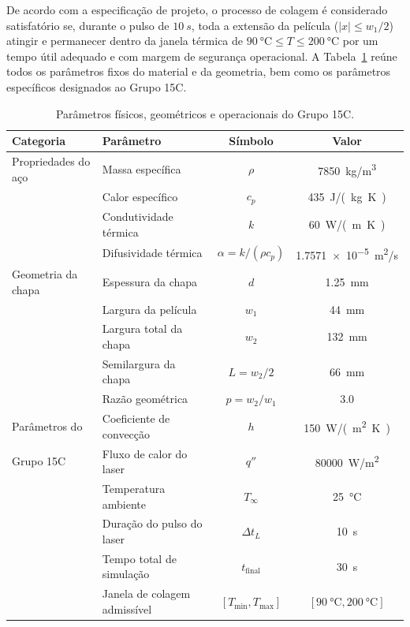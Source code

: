 \documentclass[11pt,a4paper]{article}
\begin{document}
De acordo com a especificação de projeto, o processo de colagem é considerado satisfatório se, durante o pulso de $\SI{10}{s}$, toda a extensão da película ($|x| \le w_1/2$) atingir e permanecer dentro da janela térmica de $\SI{90}{\celsius} \le T \le \SI{200}{\celsius}$ por um tempo útil adequado e com margem de segurança operacional. A Tabela~\ref{tab:parametros} reúne todos os parâmetros fixos do material e da geometria, bem como os parâmetros específicos designados ao Grupo 15C.

\begin{table}[H]
    \centering
    \caption{Parâmetros físicos, geométricos e operacionais do Grupo 15C.}
    \label{tab:parametros}
    \begin{tabular}{llcc}
        \toprule
        \textbf{Categoria} & \textbf{Parâmetro} & \textbf{Símbolo} & \textbf{Valor} \\
        \midrule
        Propriedades do aço & Massa específica & $\rho$ & \SI{7850}{kg/m^3} \\
                            & Calor específico & $c_p$ & \SI{435}{J/(kg.K)} \\
                            & Condutividade térmica & $k$ & \SI{60}{W/(m.K)} \\
                            & Difusividade térmica & $\alpha = k/(\rho c_p)$ & \SI{1,7571e-5}{m^2/s} \\
        \midrule
        Geometria da chapa  & Espessura da chapa & $d$ & \SI{1,25}{mm} \\
                            & Largura da película & $w_1$ & \SI{44}{mm} \\
                            & Largura total da chapa & $w_2$ & \SI{132}{mm} \\
                            & Semilargura da chapa & $L = w_2/2$ & \SI{66}{mm} \\
                            & Razão geométrica & $p = w_2/w_1$ & \num{3,0} \\
        \midrule
        Parâmetros do       & Coeficiente de convecção & $h$ & \SI{150}{W/(m^2.K)} \\
        Grupo 15C           & Fluxo de calor do laser & $q''$ & \SI{80000}{W/m^2} \\
                            & Temperatura ambiente & $T_\infty$ & \SI{25}{\celsius} \\
                            & Duração do pulso do laser & $\Delta t_L$ & \SI{10}{s} \\
                            & Tempo total de simulação & $t_{\text{final}}$ & \SI{30}{s} \\
                            & Janela de colagem admissível & $[T_{\min}, T_{\max}]$ & $[\SI{90}{\celsius}, \SI{200}{\celsius}]$ \\
        \bottomrule
    \end{tabular}
\end{table}
\end{document}
